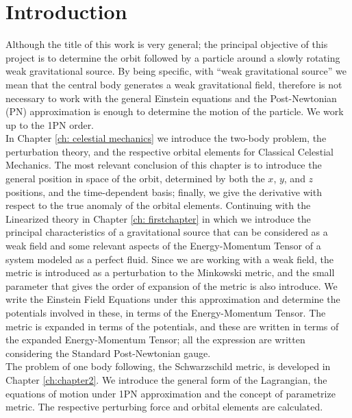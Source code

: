 \chapter*{Introduction}

Although the title of this work is very general; the principal objective of this project is to determine the orbit followed by a particle around a slowly rotating weak gravitational source. By being specific, with ``weak gravitational source'' we mean that the central body generates a weak gravitational field, therefore is not necessary to work with the general Einstein equations and the Post-Newtonian (PN) approximation is enough to determine the motion of the particle. We work up to the 1PN order. \cite{ GravityPoisson, Weinberg, Theoryandexperiments}\\

In Chapter \ref{ch: celestial mechanics} we introduce the two-body problem, the perturbation theory, and the respective orbital elements for Classical Celestial Mechanics. The most relevant conclusion of this chapter is to introduce the general position in space of the orbit, determined by both the $x$, $y$, and $z$ positions, and the time-dependent basis; finally, we give the derivative with respect to the true anomaly of the orbital elements. Continuing with the Linearized theory in Chapter \ref{ch: firstchapter} in which we introduce the principal characteristics of a gravitational source that can be considered as a weak field and some relevant aspects of the Energy-Momentum Tensor of a system modeled as a perfect fluid. Since we are working with a weak field, the metric is introduced as a perturbation to the Minkowski metric, and the small parameter that gives the order of expansion of the metric is also introduce. We write the Einstein Field Equations under this approximation and determine the potentials involved in these, in terms of the Energy-Momentum Tensor. The metric is expanded in terms of the potentials, and these are written in terms of the expanded Energy-Momentum Tensor; all the expression are written considering the Standard Post-Newtonian gauge.\cite{GravityPoisson} \\

The problem of one body following, the Schwarzschild metric, is developed in Chapter \ref{ch:chapter2}. We introduce the general form of the Lagrangian, the equations of motion under 1PN approximation and the concept of parametrize metric. The respective perturbing force and orbital elements are calculated.\\

